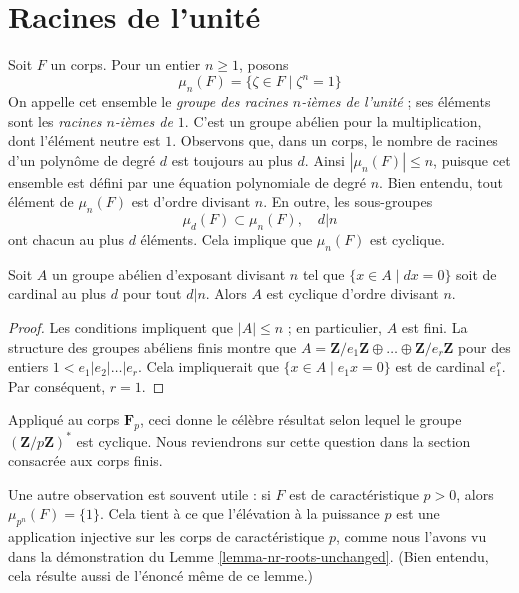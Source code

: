 \section{Racines de l’unité}
\label{section-roots-of-1}

\noindent
Soit $F$ un corps. Pour un entier $n \geq 1$, posons
$$
\mu_n(F) = \{\zeta \in F \mid \zeta^n = 1\}
$$
On appelle cet ensemble le {\it groupe des racines $n$-ièmes de l'unité} ; ses
éléments sont les {\it racines $n$-ièmes de $1$}. C'est un groupe abélien pour la multiplication,
dont l'élément neutre est $1$.
Observons que, dans un corps, le nombre de racines d'un polynôme de degré $d$
est toujours au plus $d$. Ainsi $|\mu_n(F)| \leq n$,
puisque cet ensemble est défini par une équation polynomiale de degré $n$.
Bien entendu, tout élément de $\mu_n(F)$ est d'ordre divisant $n$.
En outre, les sous-groupes
$$
\mu_d(F) \subset \mu_n(F),\quad d | n
$$
ont chacun au plus $d$ éléments. Cela implique que $\mu_n(F)$ est cyclique.

\begin{lemma}
\label{lemma-cyclic}
Soit $A$ un groupe abélien d'exposant divisant $n$ tel que
$\{x \in A \mid dx = 0\}$ soit de cardinal au plus $d$ pour tout $d | n$.
Alors $A$ est cyclique d'ordre divisant $n$.
\end{lemma}

\begin{proof}
Les conditions impliquent que $|A| \leq n$ ; en particulier, $A$ est fini.
La structure des groupes abéliens finis montre que
$A = \mathbf{Z}/e_1\mathbf{Z} \oplus \ldots \oplus \mathbf{Z}/e_r\mathbf{Z}$
pour des entiers $1 < e_1 | e_2 | \ldots | e_r$. Cela impliquerait
que $\{x \in A \mid e_1 x = 0\}$ est de cardinal $e_1^r$. Par conséquent,
$r = 1$.
\end{proof}

\noindent
Appliqué au corps $\mathbf{F}_p$, ceci donne le célèbre résultat
selon lequel le groupe $(\mathbf{Z}/p\mathbf{Z})^*$ est cyclique. Nous reviendrons sur
cette question dans la section consacrée aux corps finis.

\medskip\noindent
Une autre observation est souvent utile : si $F$ est de caractéristique
$p > 0$, alors $\mu_{p^n}(F) = \{1\}$. Cela tient à ce que l'élévation
à la puissance $p$ est une application injective sur les corps de caractéristique $p$,
comme nous l'avons vu dans la démonstration du Lemme \ref{lemma-nr-roots-unchanged}.
(Bien entendu, cela résulte aussi de l'énoncé même de ce lemme.)






